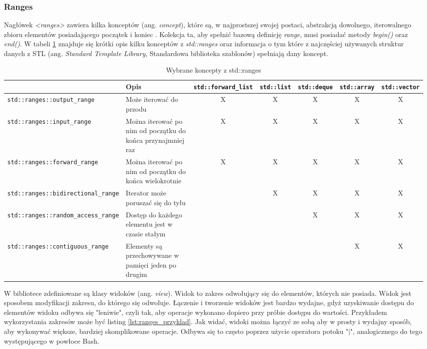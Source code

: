 \documentclass[a4paper,12pt]{book} %
\begin{document}
\subsubsection{Ranges}
Nagłówek \emph{<ranges>} zawiera kilka konceptów (ang. \emph{concept}), które są, w najprostszej swojej postaci, abstrakcją dowolnego, iterowalnego zbioru elementów posiadającego początek i koniec \cite{ranges}. Kolekcja ta, aby spełnić bazową definicję \emph{range}, musi posiadać metody \emph{begin()} oraz \emph{end()}. W tabeli \ref{ranges_concepts} znajduje się krótki opis kilku konceptów z \emph{std::ranges} oraz informacja o tym które z najczęściej używanych struktur danych z STL (ang. \emph{Standard Template Library}, Standardowa biblioteka szablonów) spełniają dany koncept.
\begin{table}[H]
\begin{adjustbox}{max width=\textheight, angle=90, center}
\begin{tabular}{|l|m{7cm}|ccccc|}
\hline
	& Opis & \texttt{std::forward\_list} & \texttt{std::list} & \texttt{std::deque} & \texttt{std::array} & \texttt{std::vector} \\
\hline
\texttt{std::ranges::output\_range} & Może iterować do przodu & X & X & X & X & X \\
\hline
\texttt{std::ranges::input\_range} & Można iterować po nim od początku do końca przynajmniej raz & X & X & X & X & X \\
\hline
\texttt{std::ranges::forward\_range} & Można iterować po nim od początku do końca wielokrotnie & X & X & X & X & X \\
\hline
\texttt{std::ranges::bidirectional\_range} & Iterator może poruszać się do tyłu & & X & X & X & X \\
\hline
\texttt{std::ranges::random\_access\_range} & Dostęp do każdego elementu jest w czasie stałym & & & X & X & X \\
\hline
\texttt{std::ranges::contiguous\_range} & Elementy są przechowywane w pamięci jeden po drugim & & & & X & X \\
\hline
\end{tabular}
\end{adjustbox}
\caption{Wybrane koncepty z std::ranges}
\label{ranges_concepts}
\end{table}
W bibliotece zdefiniowane są klasy widoków (ang. \emph{view}). Widok to zakres odwołujący się do elementów, których nie posiada. Widok jest sposobem modyfikacji zakresu, do którego się odwołuje. Łączenie i tworzenie widoków jest bardzo wydajne, gdyż uzyskiwanie dostępu do elementów widoku odbywa się "leniwie", czyli tak, aby operacje wykonano dopiero przy próbie dostępu do wartości. Przykładem wykorzystania zakresów może być listing \ref{lst:ranges_przyklad}. Jak widać, widoki można łączyć ze sobą aby w prosty i wydajny sposób, aby wykonywać większe, bardziej skomplikowane operacje. Odbywa się to często poprzez użycie operatora potoku "$|$", analogicznego do tego występującego w powłoce Bash.
\end{document}
